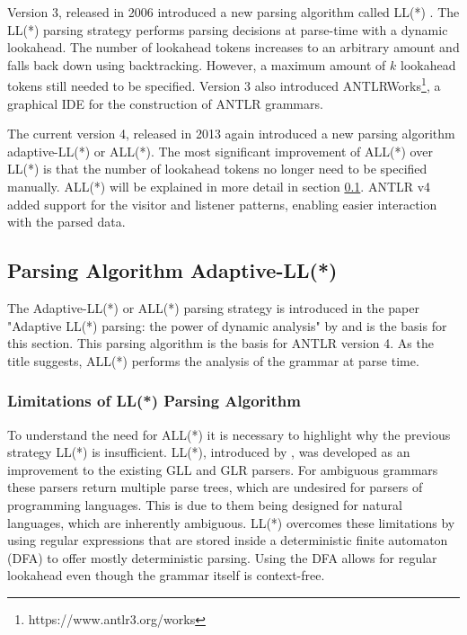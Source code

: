 Version 3, released in 2006 introduced a new parsing algorithm called LL(*) \parencite{LLSParsing2011}. The LL(*) parsing strategy performs parsing decisions at parse-time with a dynamic lookahead. The number of lookahead tokens increases to an arbitrary amount and falls back down using backtracking. However, a maximum amount of $k$ lookahead tokens still needed to be specified. Version 3 also introduced ANTLRWorks\footnote{https://www.antlr3.org/works}, a graphical IDE for the construction of ANTLR grammars.

The current version 4, released in 2013 again introduced a new parsing algorithm adaptive-LL(*) or ALL(*). The most significant improvement of ALL(*) over LL(*) is that the number of lookahead tokens no longer need to be specified manually. ALL(*) will be explained in more detail in section \ref{sec:allstar}. ANTLR v4 added support for the visitor and listener patterns, enabling easier interaction with the parsed data. 

\subsection{Parsing Algorithm Adaptive-LL(*)}
\label{sec:allstar}

The Adaptive-LL(*) or ALL(*) parsing strategy is introduced in the paper "Adaptive LL(*) parsing: the power of dynamic analysis" by \textcite{ALLParsing2014} and is the basis for this section. This parsing algorithm is the basis for ANTLR version 4. As the title suggests, ALL(*) performs the analysis of the grammar at parse time. 

\subsubsection{Limitations of LL(*) Parsing Algorithm}

To understand the need for ALL(*) it is necessary to highlight why the previous strategy LL(*) is insufficient. LL(*), introduced by \textcite{parr2011ll}, was developed as an improvement to the existing GLL \parencite{GLL2010} and GLR \parencite{tomita1991generalized} parsers.  For ambiguous grammars these parsers return multiple parse trees, which are undesired for parsers of programming languages. This is due to them being designed for natural languages, which are inherently ambiguous. LL(*) overcomes these limitations by using regular expressions that are stored inside a deterministic finite automaton (DFA) to offer mostly deterministic parsing. Using the DFA allows for regular lookahead even though the grammar itself is context-free. 

